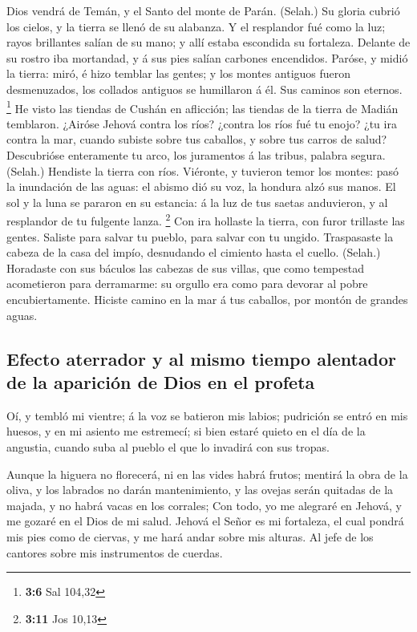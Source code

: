  Dios vendrá de Temán, y el Santo del monte de Parán.
(Selah.) Su gloria cubrió los cielos, y la tierra se llenó de su
alabanza.  Y el resplandor fué como la luz; rayos
brillantes salían de su mano; y allí estaba escondida su fortaleza.
 Delante de su rostro iba mortandad, y á sus pies salían
carbones encendidos.  Paróse, y midió la tierra: miró, é
hizo temblar las gentes; y los montes antiguos fueron desmenuzados, los
collados antiguos se humillaron á él. Sus caminos son eternos.
\footnote{\textbf{3:6} Sal 104,32}  He visto las tiendas
de Cushán en aflicción; las tiendas de la tierra de Madián temblaron.
 ¿Airóse Jehová contra los ríos? ¿contra los ríos fué tu
enojo? ¿tu ira contra la mar, cuando subiste sobre tus caballos, y sobre
tus carros de salud?  Descubrióse enteramente tu arco, los
juramentos á las tribus, palabra segura. (Selah.) Hendiste la tierra con
ríos.  Viéronte, y tuvieron temor los montes: pasó la
inundación de las aguas: el abismo dió su voz, la hondura alzó sus
manos.  El sol y la luna se pararon en su estancia: á la
luz de tus saetas anduvieron, y al resplandor de tu fulgente lanza.
\footnote{\textbf{3:11} Jos 10,13}  Con ira hollaste la
tierra, con furor trillaste las gentes.  Saliste para
salvar tu pueblo, para salvar con tu ungido. Traspasaste la cabeza de la
casa del impío, desnudando el cimiento hasta el cuello. (Selah.)
 Horadaste con sus báculos las cabezas de sus villas, que
como tempestad acometieron para derramarme: su orgullo era como para
devorar al pobre encubiertamente.  Hiciste camino en la
mar á tus caballos, por montón de grandes aguas.

\hypertarget{efecto-aterrador-y-al-mismo-tiempo-alentador-de-la-apariciuxf3n-de-dios-en-el-profeta}{%
\subsection{Efecto aterrador y al mismo tiempo alentador de la aparición
de Dios en el
profeta}\label{efecto-aterrador-y-al-mismo-tiempo-alentador-de-la-apariciuxf3n-de-dios-en-el-profeta}}

 Oí, y tembló mi vientre; á la voz se batieron mis
labios; pudrición se entró en mis huesos, y en mi asiento me estremecí;
si bien estaré quieto en el día de la angustia, cuando suba al pueblo el
que lo invadirá con sus tropas.

 Aunque la higuera no florecerá, ni en las vides habrá
frutos; mentirá la obra de la oliva, y los labrados no darán
mantenimiento, y las ovejas serán quitadas de la majada, y no habrá
vacas en los corrales;  Con todo, yo me alegraré en
Jehová, y me gozaré en el Dios de mi salud.  Jehová el
Señor es mi fortaleza, el cual pondrá mis pies como de ciervas, y me
hará andar sobre mis alturas. Al jefe de los cantores sobre mis
instrumentos de cuerdas.
